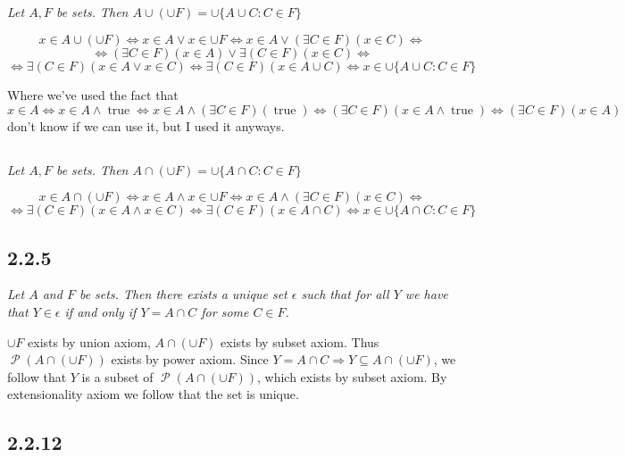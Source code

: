 \documentclass[11pt,oneside,titlepage]{book}
\DeclareMathOperator \pow {\mathcal {P}}
\DeclareMathOperator \lra {\Leftrightarrow}
\DeclareMathOperator \imp {\Rightarrow}
\DeclareMathOperator \true {true}
\begin{document}
\subsection{}

\textit{Let $A, F$ be sets. Then $A \cup (\cup F) = \cup\{A \cup C: C \in F\}$}

$$x \in A \cup (\cup F) \lra x \in A \lor x \in \cup F \lra
x \in A \lor  (\exists C \in F)(x \in C) \lra$$
$$
\lra (\exists C \in F)(x \in A) \lor \exists(C \in F)( x \in C) \lra
$$
$$ \lra 
\exists(C \in F)(x \in A \lor x \in C) \lra
\exists(C \in F)(x \in A \cup C) \lra x \in \cup\{A \cup C: C \in F\}
$$

Where we've used the fact that
$$x \in A \lra x \in A \land \true \lra x \in A \land (\exists C \in F)(\true) \lra
(\exists C \in F)(x \in A  \land \true) \lra  (\exists C \in F)(x \in A)$$
don't know if we can use it, but I used it anyways.




\subsection{}

\textit{Let $A, F$ be sets. Then $A \cap (\cup F) = \cup\{A \cap C: C \in F\}$}

$$x \in A \cap (\cup F) \lra x \in A \land x \in \cup F \lra
x \in A \land  (\exists C \in F)(x \in C) \lra$$
$$ \lra 
\exists(C \in F)(x \in A \land x \in C) \lra
\exists(C \in F)(x \in A \cap C) \lra x \in \cup\{A \cap C: C \in F\}$$


\subsection*{2.2.5}

\textit{Let $A$ and $F$ be sets. Then there exists a unique set $\epsilon$ such that for all
  $Y$ we have that $Y \in \epsilon$ if and only if $Y = A \cap C$ for some $C \in F$.}

$\cup F$ exists by union axiom, $A \cap (\cup F)$ exists by subset axiom. Thus $\pow(A \cap (\cup F))$
exists by power axiom. Since $Y = A \cap C \imp Y \subseteq A \cap (\cup F)$, we follow that
$Y$ is a subset of $\pow(A \cap (\cup F))$, which exists by subset axiom. By extensionality axiom we follow that
the set is unique.

\subsection*{2.2.12}
\end{document}
